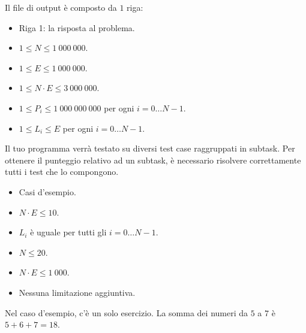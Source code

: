Il file di output è composto da $1$ riga:
\begin{itemize}
    \item Riga 1: la risposta al problema.
\end{itemize}


\Constraints

\begin{itemize}[nolistsep, itemsep=2mm]
    \item $1 \le N \le 1\:000\:000$.
    \item $1 \le E \le 1\:000\:000$.
    \item $1 \le N \cdot E \le 3\:000\:000$.
    \item $1 \le P_i \le 1\:000\:000\:000$ per ogni $i = 0 \dots N-1$.
    \item $1 \le L_i \le E$ per ogni $i = 0 \dots N-1$.
\end{itemize}


\Scoring

Il tuo programma verrà testato su diversi test case raggruppati in subtask.
Per ottenere il punteggio relativo ad un subtask,
è necessario risolvere correttamente tutti i test che lo compongono.

\begin{itemize}[nolistsep,itemsep=2mm]
    \item \subtask Casi d'esempio.
    \item \subtask $N \cdot E \le 10$.
    \item \subtask $L_i$ è uguale per tutti gli $i = 0 \dots N-1$.
    \item \subtask $N \le 20$.
    \item \subtask $N \cdot E \le 1\:000$.
    \item \subtask Nessuna limitazione aggiuntiva.
\end{itemize}


\Examples

\begin{example}
\end{example}


\Explanation

Nel caso d'esempio, c'è un solo esercizio. La somma dei numeri da $5$ a $7$ è $5+6+7 = 18$.
